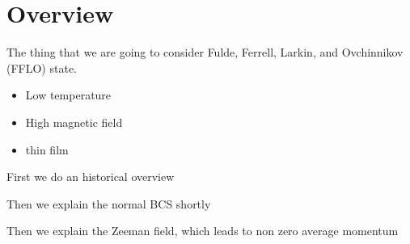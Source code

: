 \section{Overview}

The thing that we are going to consider Fulde, Ferrell, Larkin, and Ovchinnikov (FFLO) state. 

\begin{itemize}
	\item Low temperature
	\item High magnetic field
	\item thin film
\end{itemize}

First we do an historical overview

Then we explain the normal BCS shortly

Then we explain the Zeeman field, which leads to non zero average momentum

 